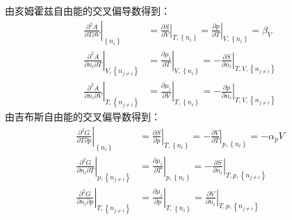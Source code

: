 \documentclass[main.tex]{subfiles}
\begin{document}
由亥姆霍兹自由能的交叉偏导数得到：
\begin{align}
    \left.\frac{\partial^2 A}{\partial T\partial V}\right|_{\left\{n_i\right\}}             & =\left.\frac{\partial S}{\partial V}\right|_{T,\left\{n_i\right\}}=\left.\frac{\partial p}{\partial T}\right|_{V,\left\{n_i\right\}}=\beta_V\label{eq:I.1_Maxwell_ATV}          \\
    \left.\frac{\partial ^2A}{\partial n_i\partial T}\right|_{V,\left\{n_{j\neq i}\right\}} & =\left.\frac{\partial \mu_i}{\partial T}\right|_{V,\left\{n_i\right\}}=-\left.\frac{\partial S}{\partial n_i}\right|_{T,V,\left\{n_{j\neq i}\right\}}\label{eq:I.1_Maxwell_AnT} \\
    \left.\frac{\partial ^2A}{\partial n_i\partial V}\right|_{T,\left\{n_{j\neq i}\right\}} & =\left.\frac{\partial \mu_i}{\partial V}\right|_{T,\left\{n_i\right\}}=-\left.\frac{\partial p}{\partial n_i}\right|_{T,V,\left\{n_{j\neq i}\right\}}\label{eq:I.1_Maxwell_AnV}
\end{align}
由吉布斯自由能的交叉偏导数得到：
\begin{align}
    \left.\frac{\partial^2 G}{\partial T\partial p}\right|_{\left\{n_i\right\}}             & =\left.\frac{\partial S}{\partial p}\right|_{T,\left\{n_i\right\}}=-\left.\frac{\partial V}{\partial T}\right|_{p,\left\{n_i\right\}}=-\alpha_p V\label{eq:I.1_Maxwell_GTp}     \\
    \left.\frac{\partial ^2G}{\partial n_i\partial T}\right|_{p,\left\{n_{j\neq i}\right\}} & =\left.\frac{\partial \mu_i}{\partial T}\right|_{p,\left\{n_i\right\}}=-\left.\frac{\partial S}{\partial n_i}\right|_{T,p,\left\{n_{j\neq i}\right\}}\label{eq:I.1_Maxwell_GnT} \\
    \left.\frac{\partial ^2G}{\partial n_i\partial p}\right|_{T,\left\{n_{j\neq i}\right\}} & =\left.\frac{\partial \mu_i}{\partial p}\right|_{T,\left\{n_i\right\}}=\left.\frac{\partial V}{\partial n_i}\right|_{T,p,\left\{n_{j\neq i}\right\}}\label{eq:I.1_Maxwell_GnV}
\end{align}
\end{document}
